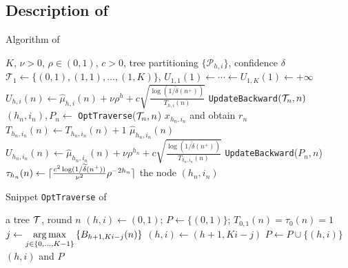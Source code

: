 \subsection{Description of \HCT{}}
\begin{algorithm}[ht]
\centering
\caption{Algorithm of \HCT{}}
\label{alg:hct}
\begin{algorithmic}[1]
     $K$, $\nu>0$, $\rho\in(0,1)$, $c>0$, tree partitioning $\{\mathcal{P}_{h,i}\}$, confidence $\delta$
     $\mathcal{T}_1 \gets \{(0,1),(1,1),\ldots,(1,K)\}$, $U_{1,1}(1) \gets \cdots \gets U_{1,K}(1) \gets +\infty$
                \State $U_{h,i}(n) \gets \hat{\mu}_{h,i}(n) + \nu\rho^{h} + c\sqrt{\frac{\operatorname{log}\left(1/\tilde{\delta}(n^+)\right)}{T_{h,i}(n)}}$
            \EndFor
            \State \texttt{UpdateBackward}$(\mathcal{T}_n, n)$
        \EndIf
        \State $(h_n,i_n),P_n \gets$ \texttt{OptTraverse}($\mathcal{T}_n, n$)
        \State {} $x_{h_n,i_n}$ and obtain $r_n$
        \State $T_{h_n,i_n}(n) \gets T_{h_n,i_n}(n)+1$
        \State {} $\hat{\mu}_{h_n,i_n}(n)$
        \State $U_{h_n,i_n}(n) \gets \hat{\mu}_{h_n,i_n}(n) + \nu\rho^{h_n} + c\sqrt{\frac{\operatorname{log}\left(1/\tilde{\delta}(n^+)\right)}{T_{h_n,i_n}(n)}}$
        \State \texttt{UpdateBackward}($P_n, n$)
        \State $\tau_{h_n}(n) \gets \lceil\frac{c^2\operatorname{log}(1/\widetilde{\delta}(n^+))}{\nu^2}\rho^{-2h_n}\rceil$
            \State {} the node $(h_n,i_n)$
        \EndIf
    \EndFor
\end{algorithmic}
\end{algorithm}

\begin{algorithm}[ht]
\centering
\caption{Snippet \texttt{OptTraverse} of \HCT{}}
\label{alg:hct_opt}
\begin{algorithmic}[1]
     a tree $\mathcal{T}$, round $n$
     $(h,i)\leftarrow (0,1)$; $P\leftarrow \{(0,1)\}$; $T_{0,1}(n)=\tau_0(n)=1$
        \State $j \gets \underset{j\in\{0,\ldots,K-1\}}{\operatorname*{arg\,max}} \left\{B_{h+1,Ki-j}(n)\right\}$
        \State $(h,i) \gets (h+1,Ki-j)$
        \State $P\leftarrow P\cup\{(h,i)\}$
    \EndWhile
     $(h,i)$ and $P$
\end{algorithmic}
\end{algorithm}

